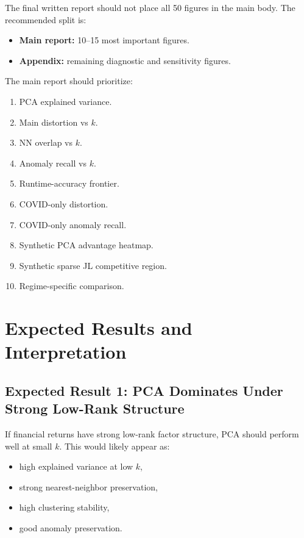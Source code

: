 \documentclass[11pt]{article}
\begin{document}
The final written report should not place all 50 figures in the main body. The recommended split is:

\begin{itemize}
    \item \textbf{Main report:} 10--15 most important figures.
    \item \textbf{Appendix:} remaining diagnostic and sensitivity figures.
\end{itemize}

The main report should prioritize:

\begin{enumerate}
    \item PCA explained variance.
    \item Main distortion vs $k$.
    \item NN overlap vs $k$.
    \item Anomaly recall vs $k$.
    \item Runtime-accuracy frontier.
    \item COVID-only distortion.
    \item COVID-only anomaly recall.
    \item Synthetic PCA advantage heatmap.
    \item Synthetic sparse JL competitive region.
    \item Regime-specific comparison.
\end{enumerate}

\section{Expected Results and Interpretation}

\subsection{Expected Result 1: PCA Dominates Under Strong Low-Rank Structure}

If financial returns have strong low-rank factor structure, PCA should perform well at small $k$. This would likely appear as:

\begin{itemize}
    \item high explained variance at low $k$,
    \item strong nearest-neighbor preservation,
    \item high clustering stability,
    \item good anomaly preservation.
\end{itemize}
\end{document}
